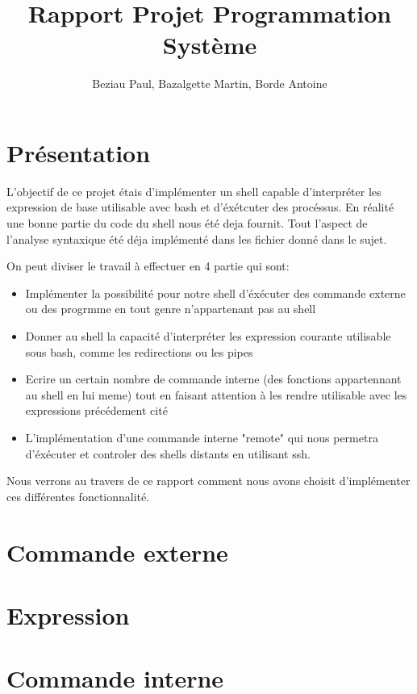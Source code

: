 \documentclass[12pt]{article}
\title{Rapport Projet Programmation Système}
\author{Beziau Paul, Bazalgette Martin, Borde Antoine}
\begin{document}
\maketitle
\tableofcontents

\newpage
\section{Présentation}

L'objectif de ce projet étais d'implémenter un shell capable d'interpréter les expression de base
utilisable avec bash et d'éxétcuter des procéssus. En réalité une bonne partie du code du shell
nous été deja fournit. Tout l'aspect de l'analyse syntaxique été déja implémenté dans les fichier
donné dans le sujet.\newline

On peut diviser le travail à effectuer en 4 partie qui sont:
\begin{itemize}
 \item Implémenter la possibilité pour notre shell d'éxécuter des
 commande externe ou des progrmme en tout genre n'appartenant pas au shell
 \item Donner au shell la capacité d'interpréter les expression courante
 utilisable sous bash, comme les redirections ou les pipes
 \item Ecrire un certain nombre de commande interne (des fonctions appartennant
 au shell en lui meme) tout en faisant attention à les rendre utilisable avec
 les expressions précédement cité
 \item L'implémentation d'une commande interne "remote" qui nous permetra d'éxécuter
 et controler des shells distants en utilisant ssh.\newline 
\end{itemize}

Nous verrons au travers de ce rapport comment nous avons choisit d'implémenter ces différentes
fonctionnalité.

\newpage
\section{Commande externe}


\newpage
\section{Expression}


\newpage
\section{Commande interne}
\end{document}
